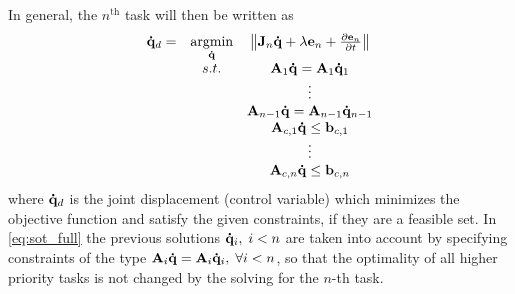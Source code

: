 In general, the  $n^{\text{th}}$ task will then be written as
\begin{equation}
\begin{array} {ccc}
    \mathbf{\dot{q}}_d  = & \underset{ \mathbf{\dot{q}} }{ \text{argmin} } & \left\| \mathbf{J}_n \mathbf{\dot{q}} + \lambda \mathbf{e}_n + \frac{\partial \mathbf{e}_n}{\partial t} \right\| \\
    & {s.t.} & \mathbf{A}_1 \mathbf{\dot{q}} = \mathbf{A}_1 \mathbf{\dot{q}}_1 \\
    & &  \vdots \\
    & & \mathbf{A}_{n-1} \mathbf{\dot{q}} = \mathbf{A}_{n-1} \mathbf{\dot{q}}_{n-1} \\
    & & \mathbf{A}_{c,1}\mathbf{\dot{q}} \leq \mathbf{b}_{c,1} \\
    & & \vdots \\
    & & \mathbf{A}_{c,n}\mathbf{\dot{q}} \leq \mathbf{b}_{c,n}
\end{array}
\label{eq:sot_full}
\end{equation}
where $\mathbf{\dot{q}}_d$ is the joint displacement (control variable) which minimizes the objective function and satisfy the given constraints, if they are a feasible set.
In \eqref{eq:sot_full} the previous solutions $\mathbf{\dot{q}}_i, \; i < n$ are taken into account by specifying constraints of the type {$\mathbf{A}_i \mathbf{\dot{q}} = \mathbf{A}_i \mathbf{\dot{q}}_i, \; \forall i < n$},  so that the optimality of all higher priority tasks is not changed by the solving for the $n$-th task.
